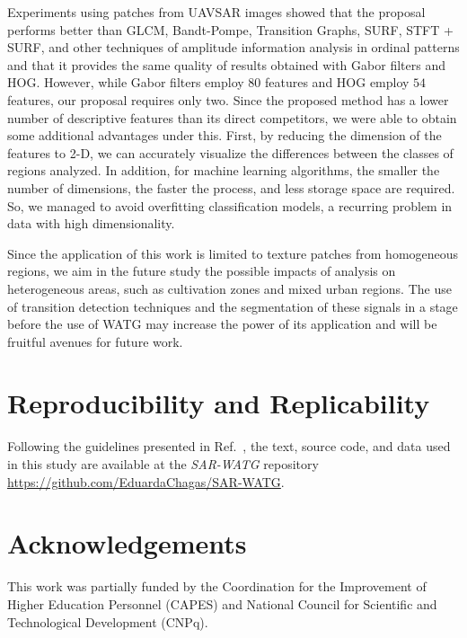 \documentclass[journal]{IEEEtran}
\begin{document}
	Experiments using patches from UAVSAR images showed that the proposal performs better than GLCM, Bandt-Pompe, Transition Graphs, SURF, STFT + SURF, and other techniques of amplitude information analysis in ordinal patterns and that it provides the same quality of results obtained with Gabor filters and HOG.
	However, while Gabor filters employ $80$ features and HOG employ $54$ features, our proposal requires only two.
	Since the proposed method has a lower number of descriptive features than its direct competitors, we were able to obtain some additional advantages under this.
	First, by reducing the dimension of the features to \mbox{2-D}, we can accurately visualize the differences between the classes of regions analyzed.
	In addition, for machine learning algorithms, the smaller the number of dimensions, the faster the process, and less storage space are required.
	So, we managed to avoid overfitting classification models, a recurring problem in data with high dimensionality.
	
	Since the application of this work is limited to texture patches from homogeneous regions, we aim in the future study the possible impacts of analysis on heterogeneous areas, such as cultivation zones and mixed urban regions.
	The use of transition detection techniques and the segmentation of these signals in a stage before the use of WATG may increase the power of its application and will be fruitful avenues for future work.
	
	
	\section{Reproducibility and Replicability} 
	
	Following the guidelines presented in Ref.~\cite{ABadgingSystemforReproducibilityandReplicabilityinRemoteSensingResearch}, the text, source code, and data used in this study are available at the \textit{SAR-WATG} repository \url{https://github.com/EduardaChagas/SAR-WATG}.
	
	
	
	
	\section*{Acknowledgements}\label{ACKNOWLEDGEMENTS}
	
	This work was partially funded by the Coordination for the Improvement of Higher Education Personnel (CAPES) and National Council for Scientific and Technological Development (CNPq).
	
\end{document}
